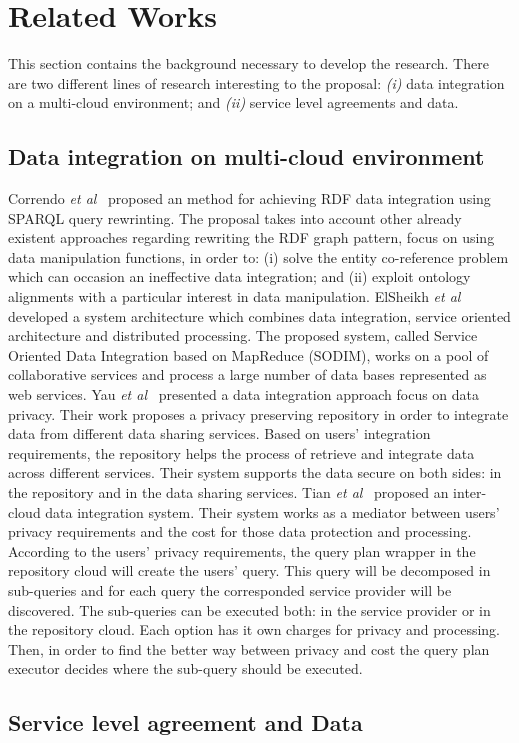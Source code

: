 \section{Related Works}\label{sec:rw}
This section contains the background necessary to develop the research.
There are two different lines of research interesting to the proposal:
\textit{(i)} data integration on a multi-cloud environment; and
\textit{(ii)} service level agreements and data.

\subsection{Data integration on multi-cloud environment}
Correndo \textit{et al}~\cite{075} proposed an method for achieving RDF data integration
using SPARQL query rewrinting. 
The proposal takes into account other already existent approaches regarding rewriting 
the RDF graph pattern, focus on using data manipulation functions, in order to: (i) solve 
the entity co-reference problem which can occasion an ineffective data integration; 
and (ii) exploit ontology alignments with a particular interest in data manipulation. 
ElSheikh \textit{et al}~\cite{078} developed a system architecture which combines data integration,
service oriented architecture and distributed processing. The proposed system, called Service 
Oriented Data Integration based on MapReduce (SODIM), works on a pool of collaborative services and 
process a large number of data bases represented as web services. 
Yau \textit{et al}~\cite{YauY08} presented a data integration approach focus on data privacy.
Their work proposes a privacy preserving repository in order to integrate data from
different data sharing services. 
Based on users' integration requirements, the repository helps the process of retrieve and integrate
data across different services.
Their system supports the data secure on both sides: in the repository and in the data sharing services. 
Tian \textit{et al}~\cite{096} proposed an inter-cloud data integration system. 
Their system works as a mediator between users' privacy requirements and the cost for those data 
protection and processing.
According to the users' privacy requirements, the query plan wrapper in the repository cloud will
create the users' query. This query will be decomposed in sub-queries and for each query the 
corresponded service provider will be discovered. 
The sub-queries can be executed both: in the service provider or in the repository cloud.
Each option has it own charges for privacy and processing. 
Then, in order to find the better way between privacy and cost the query plan executor decides where 
the sub-query should be executed.

\subsection{Service level agreement and Data}
